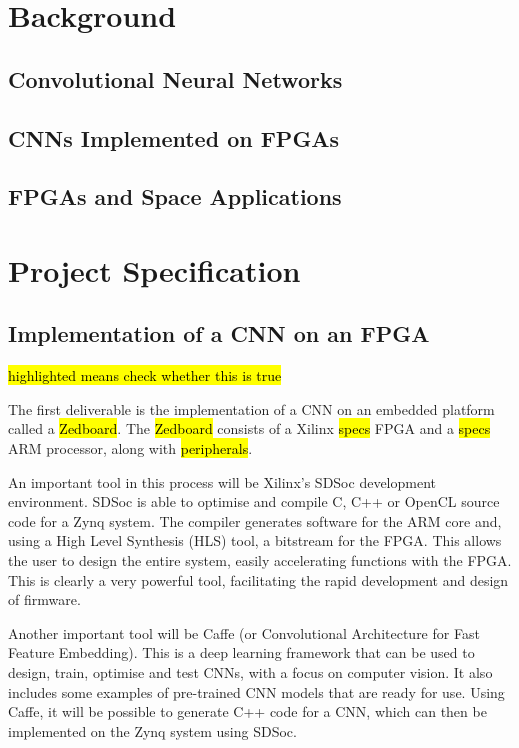 \documentclass[11pt]{article}
\begin{document}
\section{Background}
\label{sec:Background}

\subsection{Convolutional Neural Networks}
\label{sec:ConvolutionalNeuralNetworks}

\subsection{CNNs Implemented on FPGAs}
\label{sec:CNNsImplementedOnFPGAs}

\subsection{FPGAs and Space Applications}
\label{sec:FPGAsAndSpaceApplications}

\section{Project Specification}
\label{sec:ProjectSpecification}

\subsection{Implementation of a CNN on an FPGA}
\label{sec:ImplementationOfACNNOnAnFPGA}

\hl{highlighted means check whether this is true}

The first deliverable is the implementation of a CNN on an embedded platform called a \hl{Zedboard}. The \hl{Zedboard} consists of a Xilinx \hl{specs} FPGA and a \hl{specs} ARM processor, along with \hl{peripherals}. 

An important tool in this process will be Xilinx's SDSoc development environment. SDSoc is able to optimise and compile C, C++ or OpenCL source code for a Zynq system. The compiler generates software for the ARM core and, using a High Level Synthesis (HLS) tool, a bitstream for the FPGA. This allows the user to design the entire system, easily accelerating functions with the FPGA. This is clearly a very powerful tool, facilitating  the rapid development and design of firmware.

Another important tool will be Caffe (or Convolutional Architecture for Fast Feature Embedding). This is a deep learning framework that can be used to design, train, optimise and test CNNs, with a focus on computer vision. It also includes some examples of pre-trained CNN models that are ready for use. Using Caffe, it will be possible to generate C++ code for a CNN, which can then be implemented on the Zynq system using SDSoc.
\cite{jia2014caffe}
\end{document}
